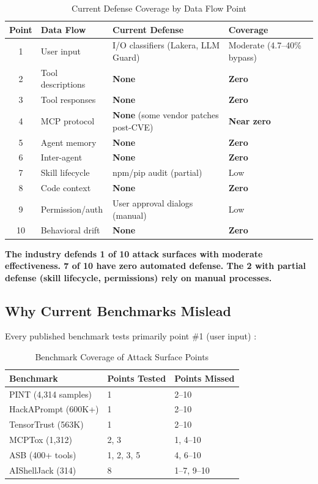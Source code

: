 \documentclass[11pt,letterpaper]{article}
\begin{document}
\begin{table}[htbp]
\centering
\caption{Current Defense Coverage by Data Flow Point}
\label{tab:defense}
\begin{tabularx}{\textwidth}{clXl}
\toprule
\textbf{Point} & \textbf{Data Flow} & \textbf{Current Defense} & \textbf{Coverage} \\
\midrule
1 & User input & I/O classifiers (Lakera, LLM Guard) & Moderate (4.7--40\% bypass) \cite{grayswan,rlinject} \\
2 & Tool descriptions & \textbf{None} & \textbf{Zero} \\
3 & Tool responses & \textbf{None} & \textbf{Zero} \\
4 & MCP protocol & \textbf{None} (some vendor patches post-CVE) & \textbf{Near zero} \\
5 & Agent memory & \textbf{None} & \textbf{Zero} \\
6 & Inter-agent & \textbf{None} & \textbf{Zero} \\
7 & Skill lifecycle & npm/pip audit (partial) & Low \\
8 & Code context & \textbf{None} & \textbf{Zero} \\
9 & Permission/auth & User approval dialogs (manual) & Low \\
10 & Behavioral drift & \textbf{None} & \textbf{Zero} \\
\bottomrule
\end{tabularx}
\end{table}

\textbf{The industry defends 1 of 10 attack surfaces with moderate effectiveness. 7 of 10 have zero automated defense. The 2 with partial defense (skill lifecycle, permissions) rely on manual processes.}


\subsection{Why Current Benchmarks Mislead}

Every published benchmark tests primarily point \#1 (user input) \cite{pint,hacka,tensortrust}:

\begin{table}[htbp]
\centering
\caption{Benchmark Coverage of Attack Surface Points}
\label{tab:benchmarks}
\begin{tabular}{lll}
\toprule
\textbf{Benchmark} & \textbf{Points Tested} & \textbf{Points Missed} \\
\midrule
PINT (4,314 samples) \cite{pint} & 1 & 2--10 \\
HackAPrompt (600K+) \cite{hacka} & 1 & 2--10 \\
TensorTrust (563K) \cite{tensortrust} & 1 & 2--10 \\
MCPTox (1,312) \cite{mcptox} & 2, 3 & 1, 4--10 \\
ASB (400+ tools) \cite{asb} & 1, 2, 3, 5 & 4, 6--10 \\
AIShellJack (314) \cite{aishell} & 8 & 1--7, 9--10 \\
\bottomrule
\end{tabular}
\end{table}
\end{document}
